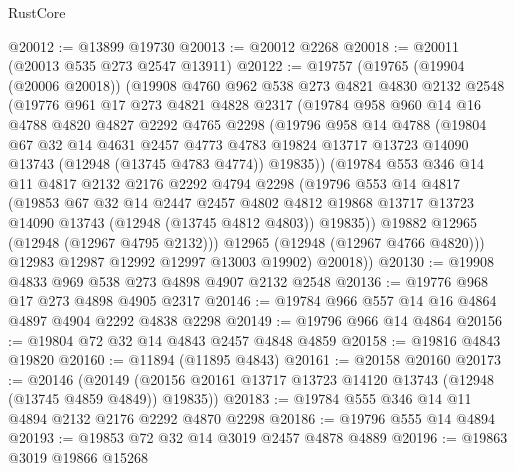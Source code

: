\begin{lexlean}{RustCore}
\begin{coremodule}
@20012 := @13899 @19730
@20013 := @20012 @2268
@20018 := @20011 (@20013 @535 @273 @2547 @13911)
@20122 := @19757
    (@19765
      (@19904 (@20006 @20018))
      (@19908
        @4760
        @962
        @538
        @273
        @4821
        @4830
        @2132
        @2548
        (@19776
          @961
          @17
          @273
          @4821
          @4828
          @2317
          (@19784
            @958
            @960
            @14
            @16
            @4788
            @4820
            @4827
            @2292
            @4765
            @2298
            (@19796
              @958
              @14
              @4788
              (@19804
                @67
                @32
                @14
                @4631
                @2457
                @4773
                @4783
                @19824
                @13717
                @13723
                @14090
                @13743
                (@12948 (@13745 @4783 @4774))
                @19835))
            (@19784
              @553
              @346
              @14
              @11
              @4817
              @2132
              @2176
              @2292
              @4794
              @2298
              (@19796
                @553
                @14
                @4817
                (@19853
                  @67
                  @32
                  @14
                  @2447
                  @2457
                  @4802
                  @4812
                  @19868
                  @13717
                  @13723
                  @14090
                  @13743
                  (@12948 (@13745 @4812 @4803))
                  @19835))
              @19882
              @12965
              (@12948 (@12967 @4795 @2132)))
            @12965
            (@12948 (@12967 @4766 @4820)))
          @12983
          @12987
          @12992
          @12997
          @13003
          @19902)
        @20018))
@20130 := @19908 @4833 @969 @538 @273 @4898 @4907 @2132 @2548
@20136 := @19776 @968 @17 @273 @4898 @4905 @2317
@20146 := @19784 @966 @557 @14 @16 @4864 @4897 @4904 @2292 @4838 @2298
@20149 := @19796 @966 @14 @4864
@20156 := @19804 @72 @32 @14 @4843 @2457 @4848 @4859
@20158 := @19816 @4843 @19820
@20160 := @11894 (@11895 @4843)
@20161 := @20158 @20160
@20173 := @20146
    (@20149 (@20156 @20161 @13717 @13723 @14120 @13743 (@12948 (@13745 @4859 @4849)) @19835))
@20183 := @19784 @555 @346 @14 @11 @4894 @2132 @2176 @2292 @4870 @2298
@20186 := @19796 @555 @14 @4894
@20193 := @19853 @72 @32 @14 @3019 @2457 @4878 @4889
@20196 := @19863 @3019 @19866 @15268

\end{coremodule}
\end{lexlean}
